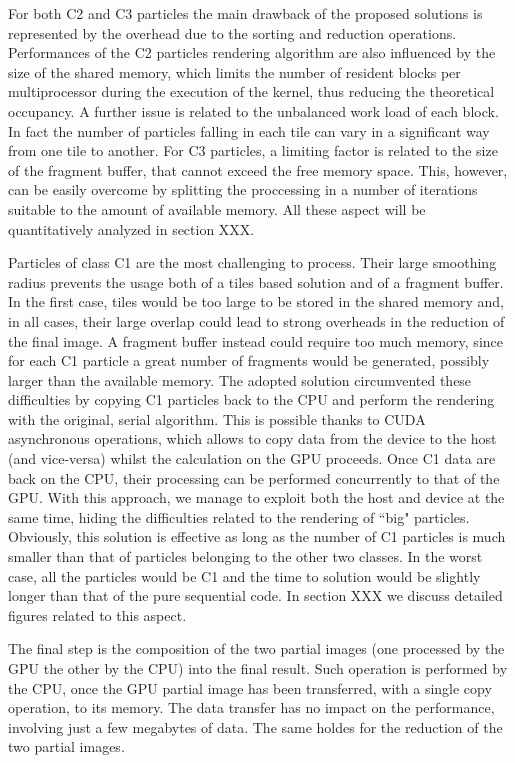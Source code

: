 \documentclass[11pt]{article}
\begin{document}
For both C2 and C3 particles the main drawback of the proposed solutions 
is represented by the overhead due to the sorting and reduction operations.
Performances of the C2 particles rendering algorithm are also influenced 
by the size of the shared memory, which limits the number of resident blocks
per multiprocessor during the execution of the kernel, thus reducing the theoretical
occupancy. A further issue is related to the
unbalanced work load of each block. In fact the number of particles falling
in each tile can vary in a significant way from one tile to another. 
For C3 particles, a limiting factor is related to the size of the fragment buffer,
that cannot exceed the free memory space. This, however, can be 
easily overcome by splitting the proccessing in a number of iterations suitable 
to the amount of available memory.  
All these aspect will be quantitatively analyzed in section XXX.

Particles of class C1 are the most challenging to process. Their large smoothing 
radius prevents the usage both of a tiles based solution and of a fragment buffer.
In the first case, tiles would be too large to be stored in the shared memory
and, in all cases, their large overlap could lead to strong overheads in the reduction of the 
final image. A fragment buffer instead could require too much memory, since 
for each C1 particle a great number of fragments would be generated, possibly
larger than the available memory. The adopted solution circumvented these 
difficulties by copying C1 particles back to the CPU and perform the rendering 
with the original, serial algorithm. This is possible thanks to CUDA asynchronous
operations, which allows to copy data from the device to the host (and vice-versa)
whilst the calculation on the GPU proceeds. Once C1 data are back on the CPU, 
their processing can be performed concurrently to that of the GPU.  
With this approach, we manage to exploit both the host and device
at the same time, hiding the difficulties related to the rendering of ``big"
particles. Obviously, this solution is effective as long as the number of C1 particles 
is much smaller than that of particles belonging to the other two classes. 
In the worst case, all the particles would be C1 and the time to solution would be slightly 
longer than that of the pure sequential code. In section XXX we discuss
detailed figures related to this aspect.

The final step is the composition of the two partial images (one processed by the
GPU the other by the CPU) into the final result. 
Such operation is performed by the CPU, 
once the GPU partial image has been transferred, with a single copy operation, to
its memory. The data transfer has no impact on the performance, involving just a few 
megabytes of data. The same holdes for the reduction of the two partial images.   
\end{document}
